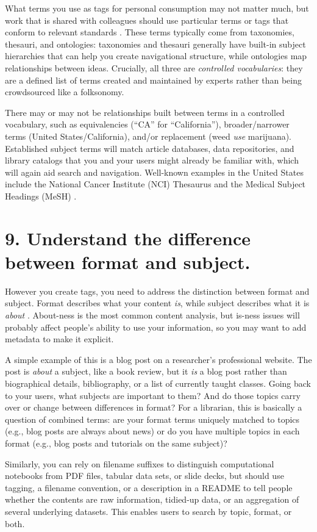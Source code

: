 \documentclass[10pt,letterpaper]{article}
\newcommand{\rulemajor}[1]{\section*{#1}}
\begin{document}
What terms you use as tags for personal consumption may not matter much, but
work that is shared with colleagues should use particular terms or tags that
conform to relevant standards \cite{FAIR2020}. These terms typically come from
taxonomies, thesauri, and ontologies: taxonomies and thesauri generally have
built-in subject hierarchies that can help you create navigational structure,
while ontologies map relationships between ideas. Crucially, all three are
\emph{controlled vocabularies}: they are a defined list of terms created and
maintained by experts rather than being crowdsourced like a folksonomy.

There may or may not be relationships built between terms in a controlled
vocabulary, such as equivalencies (``CA'' for ``California''), broader/narrower
terms (United States/California), and/or replacement (weed \emph{use}
marijuana). Established subject terms will match article databases, data
repositories, and library catalogs that you and your users might already be
familiar with, which will again aid search and navigation. Well-known examples
in the United States include the National Cancer Institute (NCI) Thesaurus
\cite{NCI2020} and the Medical Subject Headings (MeSH) \cite{ASI2020}.

\rulemajor{9. Understand the difference between format and subject.}

However you create tags, you need to address the distinction between format and
subject. Format describes what your content \emph{is}, while subject describes
what it is \emph{about} \cite{Joudrey2015}. About-ness is the most common
content analysis, but is-ness issues will probably affect people's ability to
use your information, so you may want to add metadata to make it explicit.

A simple example of this is a blog post on a researcher's professional website.
The post is \emph{about} a subject, like a book review, but it \emph{is} a blog
post rather than biographical details, bibliography, or a list of currently
taught classes. Going back to your users, what subjects are important to them?
And do those topics carry over or change between differences in format? For a
librarian, this is basically a question of combined terms: are your format terms
uniquely matched to topics (e.g., blog posts are always about news) or do you
have multiple topics in each format (e.g., blog posts and tutorials on the same
subject)?

Similarly, you can rely on filename suffixes to distinguish computational
notebooks from PDF files, tabular data sets, or slide decks, but should use
tagging, a filename convention, or a description in a README to tell people
whether the contents are raw information, tidied-up data, or an aggregation of
several underlying datasets. This enables users to search by topic, format, or
both.
\end{document}

